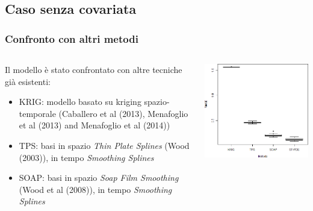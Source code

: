 \documentclass[landscape,9pt]{beamer}                           %
\begin{document}
\subsection{Caso senza covariata}
\begin{frame}
\frametitle{Confronto con altri metodi}
\begin{columns}
	\begin{column}{0.6\textwidth}
	Il modello è stato confrontato con altre tecniche già esistenti:
	\begin{itemize}
	\item<2-> KRIG: modello basato su kriging spazio-temporale (Caballero et al (2013),
Menafoglio et al (2013) and Menafoglio et al (2014))
	\item<3-> TPS: basi in spazio \textit{Thin Plate Splines} (Wood (2003)), in tempo \textit{Smoothing Splines}
	\item<4-> SOAP: basi in spazio \textit{Soap Film Smoothing} (Wood et al (2008)), in tempo \textit{Smoothing Splines} 
	\end{itemize}
	\end{column}
	\begin{column}{0.4\textwidth}
	\uncover<5->
	{\begin{flushright}
		\includegraphics[width=1\textwidth]{Immagini/Confronto_metodi.png}
	\end{flushright}}		
	\end{column}
\end{columns}
\end{frame}
\end{document}
